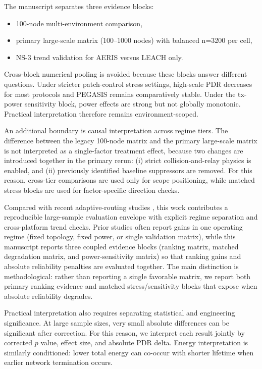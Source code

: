 ﻿\documentclass[sensors,article,submit,moreauthors,pdftex]{Definitions/mdpi}
\begin{document}
The manuscript separates three evidence blocks:
\begin{itemize}
\item 100-node multi-environment comparison,
\item primary large-scale matrix (100--1000 nodes) with balanced n=3200 per cell,
\item NS-3 trend validation for AERIS versus LEACH only.
\end{itemize}
Cross-block numerical pooling is avoided because these blocks answer different questions. Under stricter patch-control stress settings, high-scale PDR decreases for most protocols and PEGASIS remains comparatively stable. Under the tx-power sensitivity block, power effects are strong but not globally monotonic. Practical interpretation therefore remains environment-scoped.

An additional boundary is causal interpretation across regime tiers. The difference between the legacy 100-node matrix and the primary large-scale matrix is not interpreted as a single-factor treatment effect, because two changes are introduced together in the primary rerun: (i) strict collision-and-relay physics is enabled, and (ii) previously identified baseline suppressors are removed. For this reason, cross-tier comparisons are used only for scope positioning, while matched stress blocks are used for factor-specific direction checks.

Compared with recent adaptive-routing studies \cite{Ren2024,Okine2024,Naeem2024DRL,Scientific2025DRLGNN,Kaddi2024GWOCSMA,Wang2024Geographic,Tariq2024A,Jain2025Optimized,Ti2026HEOCP,Manogaran2025DDQN}, this work contributes a reproducible large-sample evaluation envelope with explicit regime separation and cross-platform trend checks. Prior studies often report gains in one operating regime (fixed topology, fixed power, or single validation matrix), while this manuscript reports three coupled evidence blocks (ranking matrix, matched degradation matrix, and power-sensitivity matrix) so that ranking gains and absolute reliability penalties are evaluated together. The main distinction is methodological: rather than reporting a single favorable matrix, we report both primary ranking evidence and matched stress/sensitivity blocks that expose when absolute reliability degrades.

Practical interpretation also requires separating statistical and engineering significance. At large sample sizes, very small absolute differences can be significant after correction. For this reason, we interpret each result jointly by corrected $p$ value, effect size, and absolute PDR delta. Energy interpretation is similarly conditioned: lower total energy can co-occur with shorter lifetime when earlier network termination occurs.
\end{document}
